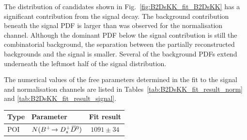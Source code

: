 The distribution of \decay{\Bp}{\Dsp\Kp\Km} candidates shown in Fig.~\ref{fig:B2DsKK_fit_B2DsKK} has a significant contribution from the signal decay. The background contribution beneath the signal PDF is larger than was observed for the normalisation channel. Although the dominant PDF below the signal contribution is still the combinatorial background, the separation between the partially reconstructed backgrounds and the signal is smaller. Several of the background PDFs extend underneath the leftmost half of the signal distribution.  


The numerical values of the free parameters determined in the fit to the signal and normalisation channels are listed in Tables~\ref{tab:B2DsKK_fit_result_norm} and \ref{tab:B2DsKK_fit_result_signal}.

\begin{table}[h]
    \centering
    \begin{tabular}{ l l c }
        \hline
        Type       & Parameter                                 & Fit result                         \\
        \hline
        POI         & $N({{{B}^+}}\!\rightarrow {\ensuremath{{D}^+_{s}}}{\ensuremath{{\kern 0.2em\overline{\kern -0.2em D}{}}{}^0}})$               & $1091\pm34$                \\


\end{tabular}
\end{table}
